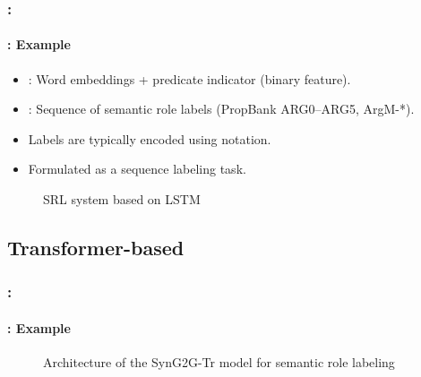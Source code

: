 \documentclass[xcolor=table]{beamer}
\begin{document}
\begin{frame}
	\frametitle{\insertshortsubtitle: \insertsection}
	\framesubtitle{\insertsubsection: Example \cite{2017-he-al}}
	
	\begin{itemize}
		\item {}: Word embeddings + predicate indicator (binary feature).
		\item {}: Sequence of semantic role labels (PropBank ARG0--ARG5, ArgM-*).
	\end{itemize}
	\begin{minipage}{.30\textwidth}
		\begin{itemize}
			\item Labels are typically encoded using  notation.
			\item Formulated as a sequence labeling task.
		\end{itemize}
	\end{minipage}
	\begin{minipage}{.68\textwidth}
		\begin{figure}
			\caption{SRL system based on LSTM \cite{2017-he-al}}
		\end{figure}
	\end{minipage}
	
\end{frame}

\subsection{Transformer-based}

\begin{frame}
	\frametitle{\insertshortsubtitle: \insertsection}
	\framesubtitle{\insertsubsection: Example}
	\begin{figure}
		\centering
		\caption{Architecture of the SynG2G-Tr model for semantic role labeling \cite{2023-mohammadshahi-henderson}}
	\end{figure}
	
\end{frame}
\end{document}

